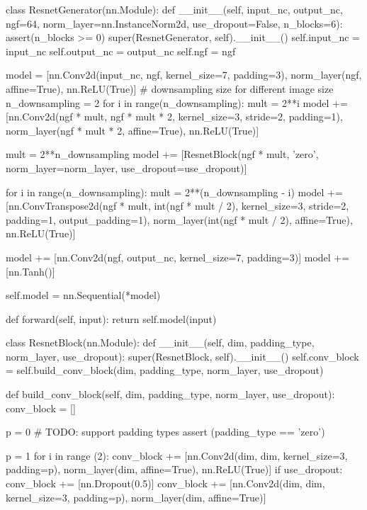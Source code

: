 \documentclass[a4paper]{article}
\begin{document}
\begin{python}
class ResnetGenerator(nn.Module):
    def __init__(self, input_nc, output_nc, ngf=64, norm_layer=nn.InstanceNorm2d, use_dropout=False, n_blocks=6):
        assert(n_blocks >= 0)
        super(ResnetGenerator, self).__init__()
        self.input_nc = input_nc
        self.output_nc = output_nc
        self.ngf = ngf

        model = [nn.Conv2d(input_nc, ngf, kernel_size=7, padding=3),
                 norm_layer(ngf, affine=True),
                 nn.ReLU(True)]
        # downsampling size for different image size
        n_downsampling = 2
        for i in range(n_downsampling):
            mult = 2**i
            model += [nn.Conv2d(ngf * mult, ngf * mult * 2, kernel_size=3,
                                stride=2, padding=1),
                      norm_layer(ngf * mult * 2, affine=True),
                      nn.ReLU(True)]

        mult = 2**n_downsampling
        model += [ResnetBlock(ngf * mult, 'zero', norm_layer=norm_layer, use_dropout=use_dropout)]

        for i in range(n_downsampling):
            mult = 2**(n_downsampling - i)
            model += [nn.ConvTranspose2d(ngf * mult, int(ngf * mult / 2),
                                         kernel_size=3, stride=2,
                                         padding=1, output_padding=1),
                      norm_layer(int(ngf * mult / 2), affine=True),
                      nn.ReLU(True)]

        model += [nn.Conv2d(ngf, output_nc, kernel_size=7, padding=3)]
        model += [nn.Tanh()]

        self.model = nn.Sequential(*model)

    def forward(self, input):
        return self.model(input)


class ResnetBlock(nn.Module):
    def __init__(self, dim, padding_type, norm_layer, use_dropout):
        super(ResnetBlock, self).__init__()
        self.conv_block = self.build_conv_block(dim, padding_type, norm_layer, use_dropout)

    def build_conv_block(self, dim, padding_type, norm_layer, use_dropout):
        conv_block = []

        p = 0
        # TODO: support padding types
        assert (padding_type == 'zero')

        p = 1
        for i in range (2):
            conv_block += [nn.Conv2d(dim, dim, kernel_size=3, padding=p),
                           norm_layer(dim, affine=True),
                           nn.ReLU(True)]
            if use_dropout:
                conv_block += [nn.Dropout(0.5)]
            conv_block += [nn.Conv2d(dim, dim, kernel_size=3, padding=p),
                           norm_layer(dim, affine=True)]


\end{python}
\end{document}
